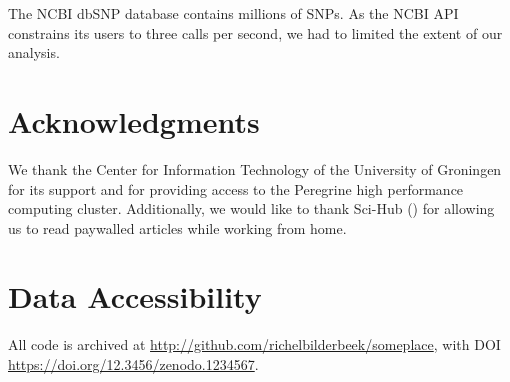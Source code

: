 The NCBI dbSNP database contains millions of SNPs.
As the NCBI API constrains its users to three calls per second,
we had to limited the extent of our analysis.

% 
% 

\section{Acknowledgments}

We thank the Center for Information Technology of the University 
of Groningen for its support and for providing access to the Peregrine 
high performance computing cluster. 
Additionally, we would like to thank Sci-Hub (\cite{himmelstein2018sci})
for allowing us to read paywalled articles while working from home.

\section{Data Accessibility}

All code is archived at \url{http://github.com/richelbilderbeek/someplace},
with DOI \url{https://doi.org/12.3456/zenodo.1234567}.

